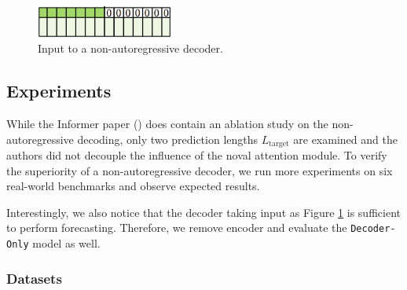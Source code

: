 \begin{figure}
    \centering
    \includegraphics[width=0.4\textwidth]{img/nonauto_input.png}
    \caption{Input to a non-autoregressive decoder.}
    \label{fig:nonauto_input}
\end{figure}

\subsection{Experiments}

While the Informer paper (\citet{https://doi.org/10.48550/arxiv.2012.07436}) does contain an ablation study on the non-autoregressive decoding, only two prediction lengths $L_\text{target}$ are examined and the authors did not decouple the influence of the noval attention module. 
To verify the superiority of a non-autoregressive decoder, we run more experiments on six real-world benchmarks and observe expected results. 

Interestingly, we also notice that the decoder taking input as Figure \ref{fig:nonauto_input} is sufficient to perform forecasting. 
Therefore, we remove encoder and evaluate the \texttt{Decoder-Only} model as well. 

\subsubsection{Datasets}\label{benchmarks}


